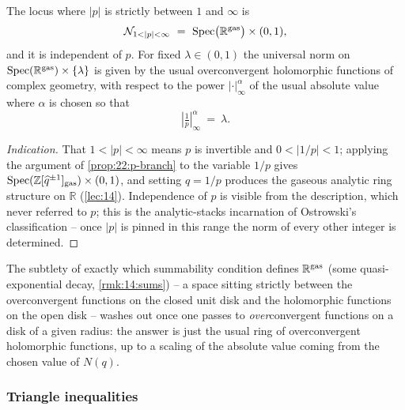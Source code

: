 \begin{proposition}
\label{prop:22:arch-branch}
The locus where $|p|$ is strictly between $1$ and $\infty$ is
\begin{equation*}
\mathcal N_{1<|p|<\infty}\ =\ \Spec\bigl(\mathbb R^{\gasx}\bigr)\times(0,1),
\end{equation*}
and it is independent of $p$. For fixed $\lambda\in(0,1)$ the universal norm on
$\operatorname{Spec}(\mathbb R^{\mathrm{gas}})\times\{\lambda\}$ is given by the usual overconvergent
holomorphic functions of complex geometry, with respect to the power
$|\cdot|_\infty^{\alpha}$ of the usual absolute value where $\alpha$ is chosen so
that
\begin{equation*}
|\tfrac1p|_\infty^{\alpha}\ =\ \lambda .
\end{equation*}
\end{proposition}

\begin{proof}[Indication]
That $1<|p|<\infty$ means $p$ is invertible and $0<|1/p|<1$; applying the
argument of \cref{prop:22:p-branch} to the variable $1/p$ gives
$\operatorname{Spec}(\mathbb Z[\widehat q^{\pm1}]_{\mathrm{gas}})\times(0,1)$, and setting $q=1/p$
produces the gaseous analytic ring structure on $\mathbb R$ (\cref{lec:14}).
Independence of $p$ is visible from the description, which never referred to $p$;
this is the analytic-stacks incarnation of Ostrowski's classification -- once
$|p|$ is pinned in this range the norm of every other integer is determined.
\end{proof}

\begin{remark}
\label{rmk:22:overconvergence-washes-out}
The subtlety of exactly which summability condition defines $\mathbb R^{\mathrm{gas}}$
(some quasi-exponential decay, \cref{rmk:14:sums}) -- a space sitting strictly
between the overconvergent functions on the closed unit disk and the holomorphic
functions on the open disk -- washes out once one passes to \emph{over}\-convergent
functions on a disk of a given radius: the answer is just the usual ring of
overconvergent holomorphic functions, up to a scaling of the absolute value
coming from the chosen value of $N(q)$.
\end{remark}

\subsubsection*{Triangle inequalities}


